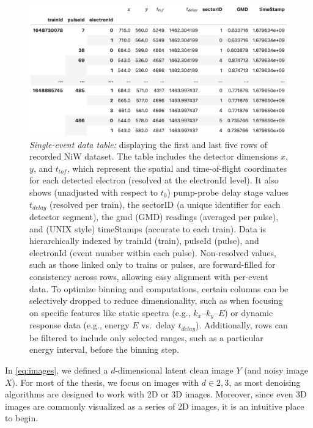 \begin{figure}[h]
    \centering
    \includegraphics[width=1\linewidth]{images/dataframe.png}
    \caption{\textit{Single-event data table:} displaying the first and last five rows of recorded \gls{NiW} dataset. The table includes the detector dimensions $x$, $y$, and $t_{tof}$, which represent the spatial and time-of-flight coordinates for each detected electron (resolved at the electronId level). It also shows (unadjusted with respect to $t_0$) pump-probe delay stage values $t_{delay}$ (resolved per train), the sectorID (a unique identifier for each detector segment), the \gls{gmd} (GMD) readings (averaged per pulse), and (UNIX style) timeStamps (accurate to each train). Data is hierarchically indexed by trainId (\gls{train}), pulseId (\gls{pulse}), and electronId (event number within each pulse). Non-resolved values, such as those linked only to trains or pulses, are forward-filled for consistency across rows, allowing easy alignment with per-event data. To optimize binning and computations, certain columns can be selectively dropped to reduce dimensionality, such as when focusing on specific features like static spectra (e.g., $k_x$–$k_y$–$E$) or dynamic response data (e.g., energy $E$ vs.\ delay $t_{delay}$). Additionally, rows can be filtered to include only selected ranges, such as a particular energy interval, before the binning step.}
    \label{fig:df}
\end{figure}

In \cref{eq:images}, we defined a $d$-dimensional latent clean image $Y$ (and noisy image $X$). For most of the thesis, we focus on images with $d \in {2,3}$, as most denoising algorithms are designed to work with 2D or 3D images. Moreover, since even 3D images are commonly visualized as a series of 2D images, it is an intuitive place to begin. 

